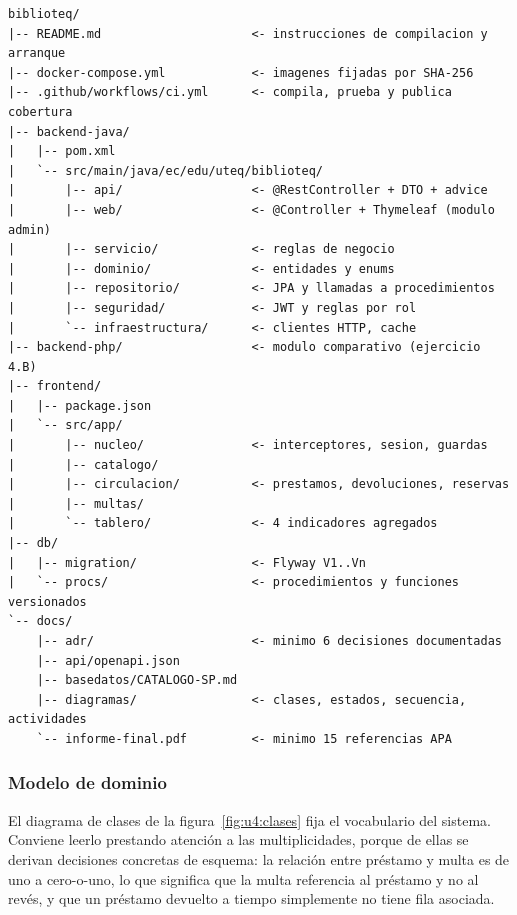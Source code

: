 \documentclass[11pt,a4paper,openany]{book}
\begin{document}
\begin{lstlisting}[style=plano,caption={Estructura del monorepo para la entrega v1.0.0.},label={lst:u4:arbol-4d}]
biblioteq/
|-- README.md                     <- instrucciones de compilacion y arranque
|-- docker-compose.yml            <- imagenes fijadas por SHA-256
|-- .github/workflows/ci.yml      <- compila, prueba y publica cobertura
|-- backend-java/
|   |-- pom.xml
|   `-- src/main/java/ec/edu/uteq/biblioteq/
|       |-- api/                  <- @RestController + DTO + advice
|       |-- web/                  <- @Controller + Thymeleaf (modulo admin)
|       |-- servicio/             <- reglas de negocio
|       |-- dominio/              <- entidades y enums
|       |-- repositorio/          <- JPA y llamadas a procedimientos
|       |-- seguridad/            <- JWT y reglas por rol
|       `-- infraestructura/      <- clientes HTTP, cache
|-- backend-php/                  <- modulo comparativo (ejercicio 4.B)
|-- frontend/
|   |-- package.json
|   `-- src/app/
|       |-- nucleo/               <- interceptores, sesion, guardas
|       |-- catalogo/
|       |-- circulacion/          <- prestamos, devoluciones, reservas
|       |-- multas/
|       `-- tablero/              <- 4 indicadores agregados
|-- db/
|   |-- migration/                <- Flyway V1..Vn
|   `-- procs/                    <- procedimientos y funciones versionados
`-- docs/
    |-- adr/                      <- minimo 6 decisiones documentadas
    |-- api/openapi.json
    |-- basedatos/CATALOGO-SP.md
    |-- diagramas/                <- clases, estados, secuencia, actividades
    `-- informe-final.pdf         <- minimo 15 referencias APA
\end{lstlisting}

\subsubsection{Modelo de dominio}

El diagrama de clases de la figura~\ref{fig:u4:clases} fija el vocabulario del sistema. Conviene leerlo prestando atención a las multiplicidades, porque de ellas se derivan decisiones concretas de esquema: la relación entre préstamo y multa es de uno a cero-o-uno, lo que significa que la multa referencia al préstamo y no al revés, y que un préstamo devuelto a tiempo simplemente no tiene fila asociada.
\end{document}
